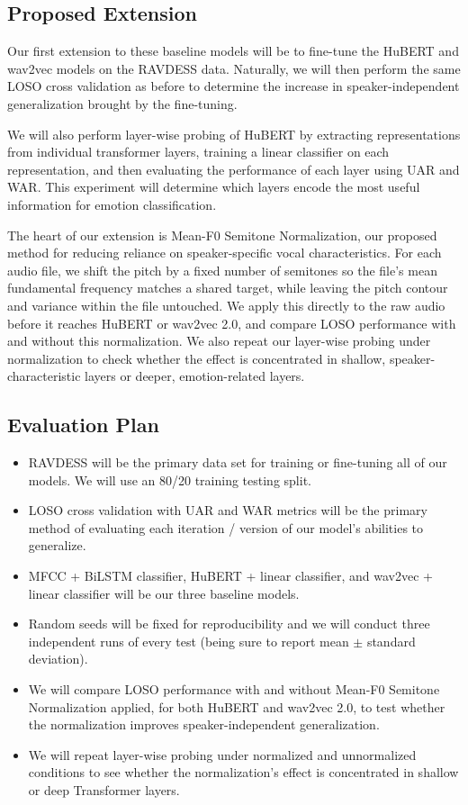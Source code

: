 \documentclass[11pt, letterpaper]{article}
\begin{document}
\subsection{Proposed Extension}

Our first extension to these baseline models will be to fine-tune the HuBERT and wav2vec models on the RAVDESS data. Naturally, we will then perform the same LOSO cross validation as before to determine the increase in speaker-independent generalization brought by the fine-tuning. 

We will also perform layer-wise probing of HuBERT by extracting representations from individual transformer layers, training a linear classifier on each representation, and then evaluating the performance of each layer using UAR and WAR. This experiment will determine which layers encode the most useful information for emotion classification.

The heart of our extension is Mean-F0 Semitone Normalization, our proposed method for reducing reliance on speaker-specific vocal characteristics. For each audio file, we shift the pitch by a fixed number of semitones so the file's mean fundamental frequency matches a shared target, while leaving the pitch contour and variance within the file untouched. We apply this directly to the raw audio before it reaches HuBERT or wav2vec 2.0, and compare LOSO performance with and without this normalization. We also repeat our layer-wise probing under normalization to check whether the effect is concentrated in shallow, speaker-characteristic layers or deeper, emotion-related layers.


\subsection{Evaluation Plan}

\begin{itemize}[noitemsep]
  \item RAVDESS will be the primary data set for training or fine-tuning all of our models. We will use an 80/20 training testing split.
  \item LOSO cross validation with UAR and WAR metrics will be the primary method of evaluating each iteration / version of our model's abilities to generalize.
  \item MFCC + BiLSTM classifier, HuBERT + linear classifier, and wav2vec + linear classifier will be our three baseline models.
  \item Random seeds will be fixed for reproducibility and we will conduct three independent runs of every test (being sure to report mean $\pm$ standard deviation).
  \item We will compare LOSO performance with and without Mean-F0 Semitone Normalization applied, for both HuBERT and wav2vec 2.0, to test whether the normalization improves speaker-independent generalization.
    
    \item We will repeat layer-wise probing under normalized and unnormalized conditions to see whether the normalization's effect is concentrated in shallow or deep Transformer layers.
\end{itemize}
\end{document}
